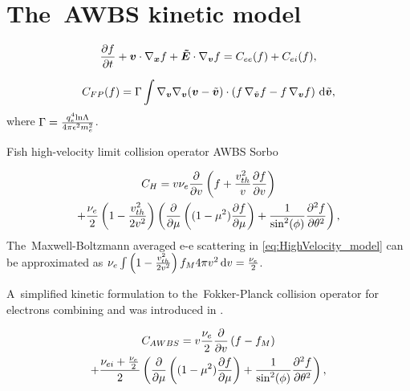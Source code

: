 \section{The~AWBS kinetic model}
\label{sec:AWBSmodel}

\begin{equation}
  \frac{\partial{f}}{\partial{t}} + \boldsymbol{v}\cdot\nabla_{\boldsymbol{x}} f + \boldsymbol{\tilde{E}} \cdot\nabla_{\boldsymbol{v}} f = C_{ee}(f) + C_{ei}(f) ,
  \nonumber
\end{equation}

\begin{equation}
  C_{FP}(f) =
  \Gamma\int \nabla_{\boldsymbol{v}}\nabla_{\boldsymbol{v}}(\boldsymbol{v} - \tilde{\boldsymbol{v}}) \cdot \left(
  f\, \nabla_{\tilde{\boldsymbol{v}}} f - f\, \nabla_{\boldsymbol{v}} f \right)\, \text{d}\tilde{\boldsymbol{v}} ,
  \nonumber
\end{equation}
where $\Gamma = \frac{q_e^4\text{ln}\Lambda}{4\pi\epsilon^2m_e^2}$.

Fish high-velocity limit collision operator \cite{Fish_RMP1987}
AWBS \cite{AWBS_PRL1986}
Sorbo \cite{Sorbo_2015, Sorbo_2016}

\begin{multline}
  C_{H} = v \nu_{e} \frac{\partial{}}{\partial{v}}\left(f + 
  \frac{v_{th}^2}{v}\frac{\partial{f}}{\partial{v}}\right) \\
  + \frac{\nu_{e}}{2}\left( 1 - \frac{v_{th}^2}{2v^2}\right) 
  \left(\frac{\partial{}}{\partial{\mu}}\left((1 - \mu^2)\frac{\partial{f}}{\partial{\mu}}\right)
  + \frac{1}{\sin^2(\phi)}\frac{\partial^2f}{\partial\theta^2} \right)
  , \label{eq:HighVelocity_model}
\end{multline}
The~Maxwell-Boltzmann averaged e-e scattering in 
\eqref{eq:HighVelocity_model} can be approximated as 
$\nu_{e} \int\left(1 - \frac{v_{th}^2}{2v^2}\right)f_M 4\pi v^2\, \text{d}v = 
\frac{\nu_{e}}{2}$.

A~simplified kinetic formulation to the~Fokker-Planck collision operator 
for electrons combining \cite{Fish_RMP1987} and  \cite{AWBS_PRL1986}
was introduced in \cite{Sorbo_2015}.

\begin{multline}
  C_{AWBS} = v \frac{\nu_{e}}{2}\frac{\partial{}}{\partial{v}}\left(f - f_M\right) \\
  + \frac{\nu_{ei} + \frac{\nu_{e}}{2}}{2} 
  \left(\frac{\partial{}}{\partial{\mu}}\left((1 - \mu^2)\frac{\partial{f}}{\partial{\mu}}\right)
  + \frac{1}{\sin^2(\phi)}\frac{\partial^2f}{\partial\theta^2} \right)
  , \label{eq:AWBS_model}
\end{multline}
